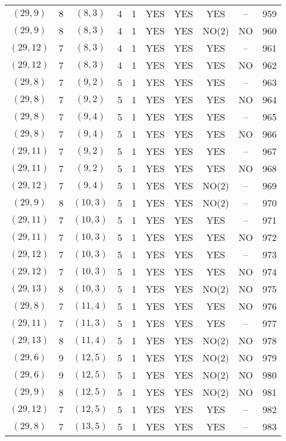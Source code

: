 \begin{longtable}{|c|c|c|c|c|c|c|c|c|c|}
$(29, 9)$ & 8 & $(8, 3)$ & 4 & 1 & YES & YES & YES & -- & 959\\
$(29, 9)$ & 8 & $(8, 3)$ & 4 & 1 & YES & YES & NO(2) & NO & 960\\
$(29, 12)$ & 7 & $(8, 3)$ & 4 & 1 & YES & YES & YES & -- & 961\\
$(29, 12)$ & 7 & $(8, 3)$ & 4 & 1 & YES & YES & YES & NO & 962\\
$(29, 8)$ & 7 & $(9, 2)$ & 5 & 1 & YES & YES & YES & -- & 963\\
$(29, 8)$ & 7 & $(9, 2)$ & 5 & 1 & YES & YES & YES & NO & 964\\
$(29, 8)$ & 7 & $(9, 4)$ & 5 & 1 & YES & YES & YES & -- & 965\\
$(29, 8)$ & 7 & $(9, 4)$ & 5 & 1 & YES & YES & YES & NO & 966\\
$(29, 11)$ & 7 & $(9, 2)$ & 5 & 1 & YES & YES & YES & -- & 967\\
$(29, 11)$ & 7 & $(9, 2)$ & 5 & 1 & YES & YES & YES & NO & 968\\
$(29, 12)$ & 7 & $(9, 4)$ & 5 & 1 & YES & YES & NO(2) & -- & 969\\
$(29, 9)$ & 8 & $(10, 3)$ & 5 & 1 & YES & YES & NO(2) & -- & 970\\
$(29, 11)$ & 7 & $(10, 3)$ & 5 & 1 & YES & YES & YES & -- & 971\\
$(29, 11)$ & 7 & $(10, 3)$ & 5 & 1 & YES & YES & YES & NO & 972\\
$(29, 12)$ & 7 & $(10, 3)$ & 5 & 1 & YES & YES & YES & -- & 973\\
$(29, 12)$ & 7 & $(10, 3)$ & 5 & 1 & YES & YES & YES & NO & 974\\
$(29, 13)$ & 8 & $(10, 3)$ & 5 & 1 & YES & YES & NO(2) & NO & 975\\
$(29, 8)$ & 7 & $(11, 4)$ & 5 & 1 & YES & YES & YES & NO & 976\\
$(29, 11)$ & 7 & $(11, 3)$ & 5 & 1 & YES & YES & YES & -- & 977\\
$(29, 13)$ & 8 & $(11, 4)$ & 5 & 1 & YES & YES & NO(2) & NO & 978\\
$(29, 6)$ & 9 & $(12, 5)$ & 5 & 1 & YES & YES & NO(2) & NO & 979\\
$(29, 6)$ & 9 & $(12, 5)$ & 5 & 1 & YES & YES & NO(2) & NO & 980\\
$(29, 9)$ & 8 & $(12, 5)$ & 5 & 1 & YES & YES & NO(2) & NO & 981\\
$(29, 12)$ & 7 & $(12, 5)$ & 5 & 1 & YES & YES & YES & -- & 982\\
$(29, 8)$ & 7 & $(13, 5)$ & 5 & 1 & YES & YES & YES & -- & 983\\

\end{longtable}
